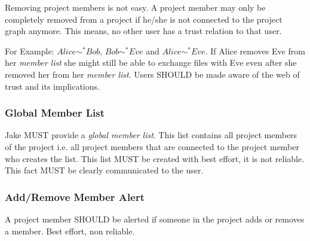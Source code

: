 Removing project members is not easy. A project member may only be completely removed from a project if he/she is not connected to the project graph anymore.
This means, no other user has a trust relation to that user.

For Example: $Alice \sim ^* Bob$, $Bob \sim ^* Eve$ and $Alice \sim ^* Eve$. If Alice removes Eve from her \emph{member list} she might still be able to exchange files with Eve even after she removed her from her \emph{member list}. Users SHOULD be made aware of the web of trust and its implications. 

\subsubsection{Global Member List}
Jake MUST provide a \emph{global member list}. This list contains all project members of the project i.e. all project members that are connected to the project member who creates the list. This list MUST be created with best effort, it is not reliable. This fact MUST be clearly communicated to the user. 

\subsubsection{Add/Remove Member Alert}
A project member SHOULD be alerted if someone in the project adds or removes a member. Best effort, non reliable. 

